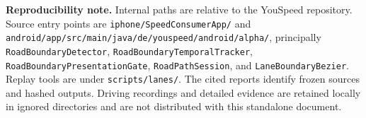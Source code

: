\documentclass[11pt,a4paper]{article}
\newcommand{\code}[1]{\texttt{\small #1}}
\begin{document}
\vspace{5pt}
{\small\textbf{Reproducibility note.}
Internal paths are relative to the YouSpeed repository. Source entry points are
\nolinkurl{iphone/SpeedConsumerApp/} and
\nolinkurl{android/app/src/main/java/de/youspeed/android/alpha/}, principally
\code{RoadBoundaryDetector}, \code{RoadBoundaryTemporalTracker},
\code{RoadBoundaryPresentationGate}, \code{RoadPathSession}, and
\code{LaneBoundaryBezier}. Replay tools are under \nolinkurl{scripts/lanes/}.
The cited reports identify frozen sources and hashed outputs. Driving recordings
and detailed evidence are retained locally in ignored directories and are not
distributed with this standalone document.}
\end{document}
